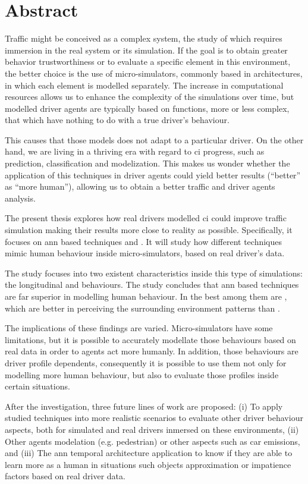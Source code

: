 \cleardoublepage
\thispagestyle{empty}
\chapter*{Abstract}
\begin{fullwidth}
	Traffic might be conceived as a complex system, the study of which requires immersion in the real system or its simulation. If the goal is to obtain greater behavior trustworthiness or to evaluate a specific element in this environment, the better choice is the use of micro-simulators, commonly based in  architectures, in which each element is modelled separately. The increase in computational resources allows us to enhance the complexity of the simulations over time, but modelled driver agents are typically based on functions, more or less complex, that which have nothing to do with a true driver’s behaviour. 
	
	This causes that those models does not adapt to a particular driver. On the other hand, we are living in a thriving era with regard to \Acrlong{ci} progress, such as prediction, classification and modelization. This makes us wonder whether the application of this techniques in driver agents could yield better results (\enquote{better} as \enquote{more human}), allowing us to obtain a better traffic and driver agents analysis.
	
	The present thesis explores how real drivers modelled \acrlong{ci} could improve traffic simulation making their results more close to reality as possible. Specifically, it focuses on \Acrlong{ann} based techniques and . It will study how different techniques mimic human behaviour inside micro-simulators, based on real driver’s data.
	
	The study focuses into two existent characteristics inside this type of simulations: the longitudinal and  behaviours. The study concludes that \acrlong{ann} based techniques are far superior in modelling human behaviour. In  the best among them are , which are better in perceiving the surrounding environment patterns than .
	
	The implications of these findings are varied. Micro-simulators have some limitations, but it is possible to accurately modellate those behaviours based on real data in order to agents act more humanly. In addition, those behaviours are driver profile dependents, consequently it is possible to use them not only for modelling more human behaviour, but also to evaluate those profiles inside certain situations.
	
	After the investigation, three future lines of work are proposed: (i) To apply studied techniques into more realistic scenarios to evaluate other driver behaviour aspects, both for simulated and real drivers inmersed on these environments, (ii) Other agents modelation (e.g. pedestrian) or other aspects such as car emissions, and (iii) The \acrlong{ann} temporal architecture application to know if they are able to learn more as a human in situations such objects approximation or impatience factors based on real driver data.
\end{fullwidth}